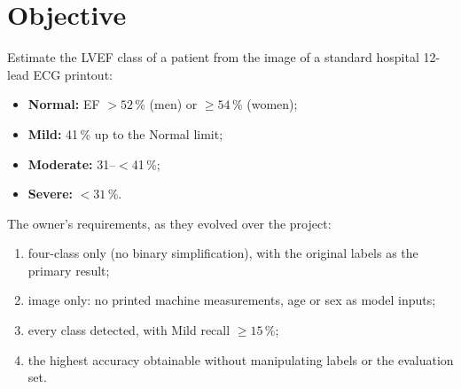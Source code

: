 \section{Objective}\label{sec:intro}
Estimate the LVEF class of a patient from the image of a standard hospital 12-lead ECG printout:
\begin{itemize}
  \item \textbf{Normal:} EF $>52$\,\% (men) or $\ge54$\,\% (women);
  \item \textbf{Mild:} 41\,\% up to the Normal limit;
  \item \textbf{Moderate:} 31--$<$41\,\%;
  \item \textbf{Severe:} $<31$\,\%.
\end{itemize}
The owner's requirements, as they evolved over the project:
\begin{enumerate}
  \item four-class only (no binary simplification), with the original labels as the primary result;
  \item image only: no printed machine measurements, age or sex as model inputs;
  \item every class detected, with Mild recall $\ge 15$\,\%;
  \item the highest accuracy obtainable without manipulating labels or the evaluation set.
\end{enumerate}

